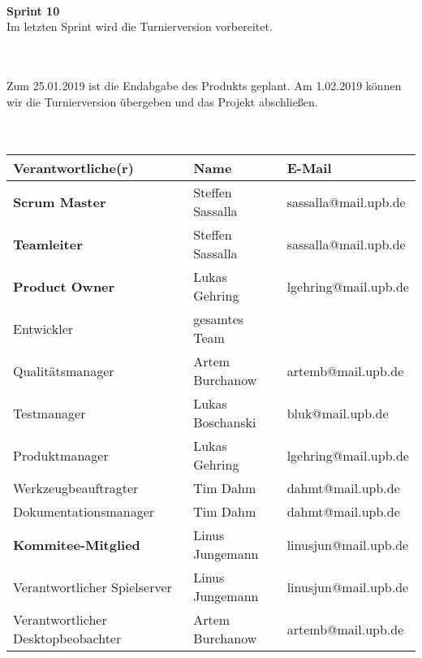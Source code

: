 \documentclass[11pt, a4paper]{article} %
\begin{document}
\ \\\textbf{Sprint 10}
\ \\Im letzten Sprint wird die Turnierversion vorbereitet.

\ \\\\Zum 25.01.2019 ist die Endabgabe des Produkts geplant. Am 1.02.2019 können wir die Turnierversion übergeben und das Projekt abschließen.\\\\\\

\hspace{-1cm}
\renewcommand{\arraystretch}{1.4}
\begin{tabular}[b]{|l|l|p{4.5cm}|}
\toprule
Verantwortliche(r) & Name & E-Mail\\
\toprule[1.5pt]
\textbf{Scrum Master} & Steffen Sassalla & sassalla@mail.upb.de\\
\midrule
\textbf{Teamleiter} & Steffen Sassalla & sassalla@mail.upb.de\\
\midrule
\textbf{Product Owner} & Lukas Gehring & lgehring@mail.upb.de\\
\midrule
Entwickler & gesamtes Team & \\
\midrule
Qualitätsmanager & Artem Burchanow & artemb@mail.upb.de\\
\midrule
Testmanager & Lukas Boschanski & bluk@mail.upb.de\\
\midrule
Produktmanager & Lukas Gehring & lgehring@mail.upb.de\\
\midrule
Werkzeugbeauftragter & Tim Dahm & dahmt@mail.upb.de\\
\midrule
Dokumentationsmanager & Tim Dahm & dahmt@mail.upb.de\\
\midrule
\textbf{Kommitee-Mitglied} & Linus Jungemann & linusjun@mail.upb.de\\
\midrule
Verantwortlicher Spielserver & Linus Jungemann & linusjun@mail.upb.de\\
\midrule
Verantwortlicher Desktopbeobachter & Artem Burchanow & artemb@mail.upb.de\\
\bottomrule
\end{tabular}
\renewcommand{\arraystretch}{1}
\end{document}
